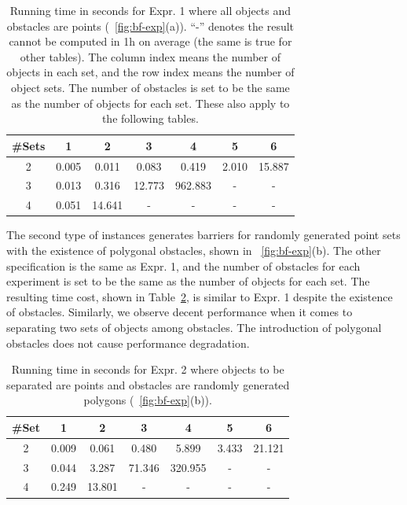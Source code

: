 \begin{table}[ht]
    \centering
    \begin{tabular}{|c|c|c|c|c|c|c|}\hline
        \#Sets &  1 & 2 & 3 & 4& 5& 6\\\hline
 2& 0.005 & 0.011 & 0.083 & 0.419 & 2.010 & 15.887 \\\hline
 3& 0.013 & 0.316 & 12.773 & 962.883 & - & - \\\hline
 4& 0.051 & 14.641 &  -& - &  -&- \\\hline
\end{tabular}
    \caption{Running time in seconds for Expr. 1 where all objects and obstacles are points (~\ref{fig:bf-exp}(a)). ``-'' denotes the result cannot be computed in 1h on average (the same is true for other tables). 
    The column index means the number of objects in each set, and the row index means the number of object sets.
    The number of obstacles is set to be the same as the number of objects for each set. These also apply to the following tables.
    }
    \label{tab:bf-expr_1}
\end{table}

 The second type of instances generates barriers for randomly generated 
 point sets with the existence of polygonal obstacles, shown in ~\ref{fig:bf-exp}(b). 
 The other specification is the same as Expr. 1, and the number of obstacles for each experiment is set to be the same as the number of objects for each set. 
 The resulting time cost, shown in Table~\ref{tab:bf-expr_2}, is similar to Expr. 1 despite the existence of obstacles.
 Similarly, we observe decent performance when it comes to separating two sets of objects among obstacles. 
 The introduction of polygonal obstacles does not cause performance degradation. 


\begin{table}[ht]
    \centering
    \begin{tabular}{|c|c|c|c|c|c|c|}\hline
        \#Set &  1 & 2 & 3 & 4& 5& 6\\\hline
2& 0.009 & 0.061 & 0.480 & 5.899 & 3.433 & 21.121\\\hline
 3& 0.044 & 3.287 & 71.346 & 320.955 & - & -\\\hline
 4& 0.249 & 13.801 & - & - & - & -\\\hline
    \end{tabular}
    \caption{Running time in seconds for Expr. 2 where objects to be separated are points and obstacles are randomly generated polygons (~\ref{fig:bf-exp}(b)). 
    }
    \label{tab:bf-expr_2}
    \vspace{-2mm}
\end{table}
 
